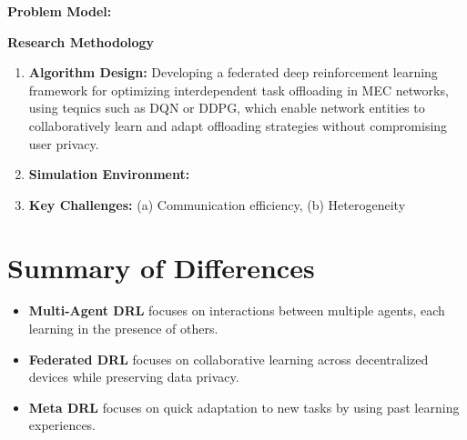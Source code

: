 \documentclass[12pt]{article}
\begin{document}
\vspace{3mm}

\noindent\textbf{\large Problem Model: } 
\noindent



\vspace{5mm}

\noindent\textbf{\large Research Methodology}

\begin{enumerate} \item \textbf{Algorithm Design:} Developing a federated deep reinforcement learning framework for optimizing interdependent task offloading in MEC networks, using teqnics such as DQN or DDPG, which enable network entities to collaboratively learn and adapt offloading strategies without compromising user privacy. \item \textbf{Simulation Environment:}  \item \textbf{Key Challenges:} (a) Communication efficiency, (b) Heterogeneity  
\end{enumerate}



\section{Summary of Differences} \begin{itemize} \item \textbf{Multi-Agent DRL} focuses on interactions between multiple agents, each learning in the presence of others. \item \textbf{Federated DRL} focuses on collaborative learning across decentralized devices while preserving data privacy. \item \textbf{Meta DRL} focuses on quick adaptation to new tasks by using past learning experiences. \end{itemize}





\end{document}
